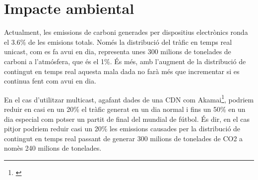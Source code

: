 \section{Impacte ambiental}
{
    Actualment, les emissions de carboni generades per dispositius electrònics ronda el 3.6\% de les emisions totals.
    Només la distribució del tràfic en temps real unicast, com es fa avui en dia, representa unes 300 milions de tonelades
    de carboni a l'atmósfera, que és el 1\%. És més, amb l'augment de la distribució de contingut en temps real aquesta
    mala dada no farà més que incrementar si es continua fent com avui en dia.

    En el cas d'utilitzar multicast, agafant dades de una CDN com Akamai\footnote{\cite{Multicast for the Web}},
    podriem reduir en casi en un 20\% el tràfic generat en un dia normal i fins un 50\% en un dia especial com potser
    un partit de final del mundial de fútbol. És dir, en el cas pitjor podriem reduir casi un 20\% les emissions causades
    per la distribució de contingut en temps real passant de generar 300 milions de tonelades de CO2 a nomès 240 milions de tonelades.

}